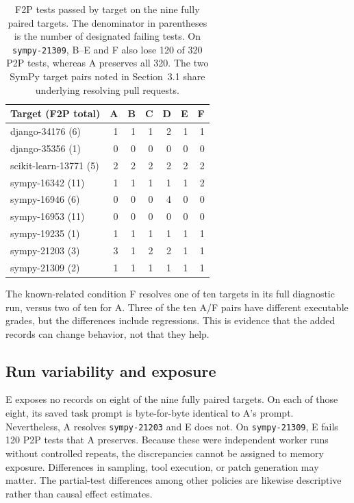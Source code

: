 \documentclass[sigconf,anonymous]{aamas}
\begin{document}
\begin{table}[t]
\caption{F2P tests passed by target on the nine fully paired targets. The denominator in parentheses is the number of designated failing tests. On \texttt{sympy-21309}, B--E and F also lose 120 of 320 P2P tests, whereas A preserves all 320. The two SymPy target pairs noted in Section~3.1 share underlying resolving pull requests.}
\label{tab:targets}
\centering
\begin{tabular}{lrrrrrr}
\toprule
Target (F2P total) & A & B & C & D & E & F\\
\midrule
django-34176 (6) & 1 & 1 & 1 & 2 & 1 & 1\\
django-35356 (1) & 0 & 0 & 0 & 0 & 0 & 0\\
scikit-learn-13771 (5) & 2 & 2 & 2 & 2 & 2 & 2\\
sympy-16342 (11) & 1 & 1 & 1 & 1 & 1 & 2\\
sympy-16946 (6) & 0 & 0 & 0 & 4 & 0 & 0\\
sympy-16953 (11) & 0 & 0 & 0 & 0 & 0 & 0\\
sympy-19235 (1) & 1 & 1 & 1 & 1 & 1 & 1\\
sympy-21203 (3) & 3 & 1 & 2 & 2 & 1 & 1\\
sympy-21309 (2) & 1 & 1 & 1 & 1 & 1 & 1\\
\bottomrule
\end{tabular}
\end{table}

The known-related condition F resolves one of ten targets in its full diagnostic run, versus two of ten for A. Three of the ten A/F pairs have different executable grades, but the differences include regressions. This is evidence that the added records can change behavior, not that they help.

\subsection{Run variability and exposure}
E exposes no records on eight of the nine fully paired targets. On each of those eight, its saved task prompt is byte-for-byte identical to A's prompt. Nevertheless, A resolves \texttt{sympy-21203} and E does not. On \texttt{sympy-21309}, E fails 120 P2P tests that A preserves. Because these were independent worker runs without controlled repeats, the discrepancies cannot be assigned to memory exposure. Differences in sampling, tool execution, or patch generation may matter. The partial-test differences among other policies are likewise descriptive rather than causal effect estimates.
\end{document}
